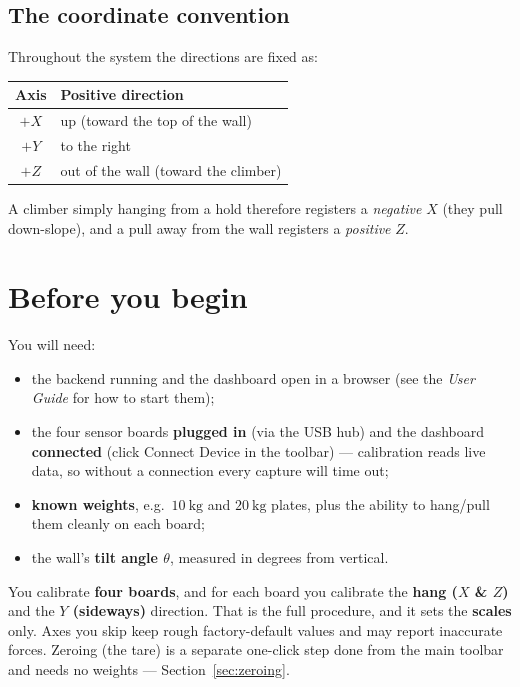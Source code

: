 \documentclass[11pt,a4paper]{article}
\begin{document}
\subsection{The coordinate convention}
Throughout the system the directions are fixed as:
\begin{center}
\begin{tabular}{@{}cl@{}}
\toprule
\textbf{Axis} & \textbf{Positive direction} \\
\midrule
$+X$ & up (toward the top of the wall) \\
$+Y$ & to the right \\
$+Z$ & out of the wall (toward the climber) \\
\bottomrule
\end{tabular}
\end{center}
A climber simply hanging from a hold therefore registers a \emph{negative} $X$
(they pull down-slope), and a pull away from the wall registers a \emph{positive}
$Z$.

\section{Before you begin}

You will need:
\begin{itemize}[leftmargin=1.4em]
  \item the backend running and the dashboard open in a browser (see the
        \emph{User Guide} for how to start them);
  \item the four sensor boards \textbf{plugged in} (via the USB hub) and the
        dashboard \textbf{connected} (click \textsf{Connect Device} in the
        toolbar) --- calibration reads live data, so without a connection every
        capture will time out;
  \item \textbf{known weights}, e.g.\ $10~\mathrm{kg}$ and $20~\mathrm{kg}$ plates,
        plus the ability to hang/pull them cleanly on each board;
  \item the wall's \textbf{tilt angle $\theta$}, measured in degrees from vertical.
\end{itemize}

\begin{infobox}
You calibrate \textbf{four boards}, and for each board you calibrate the
\textbf{hang ($X$ \& $Z$)} and the \textbf{$Y$ (sideways)} direction. That is the
full procedure, and it sets the \textbf{scales} only. Axes you skip keep rough
factory-default values and may report inaccurate forces. Zeroing (the tare) is a
separate one-click step done from the main toolbar and needs no weights ---
Section~\ref{sec:zeroing}.
\end{infobox}
\end{document}
